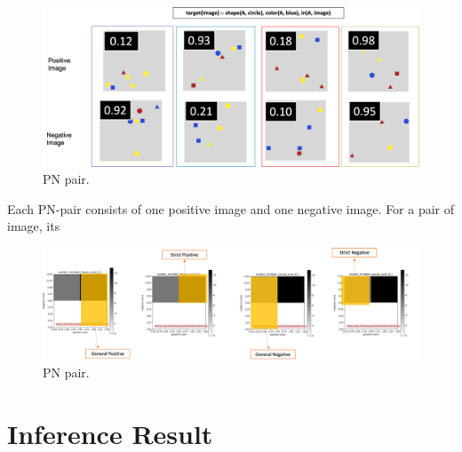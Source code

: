 \documentclass[
]{ceurart}
\begin{document}
\begin{figure}[h]
	\centering
	\begin{minipage}{\textwidth}
	\includegraphics[width=\linewidth]{img/PN_pair_4.png} 
	\caption{PN pair.}
	\label{fig:pn-pair}
	\end{minipage}
\end{figure}


Each PN-pair consists of one positive image and one negative image. For a pair of image, its

\begin{figure}[h]
	\centering
	\begin{minipage}{\textwidth}
		\includegraphics[width=\linewidth]{img/4_zone_heat_explain.png} 
		\caption{PN pair.}
		\label{fig:4-zone-heat-explain}
	\end{minipage}
\end{figure}





\section{Inference Result}
\end{document}
